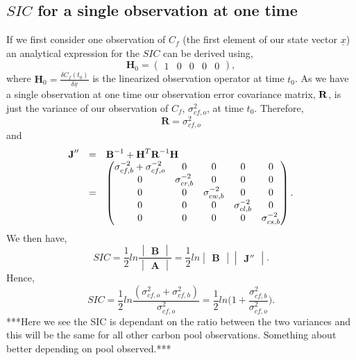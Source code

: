 \documentclass[11pt]{article}
\begin{document}
\subsection*{$SIC$ for a single observation at one time}

If we first consider one observation of $C_f$ (the first element of our state vector $\underline{x}$) an analytical expression for the $SIC$ can be derived using,
\[
\textbf{H}_{0} = \begin{pmatrix}
1 & 0 & 0 & 0 & 0
\end{pmatrix},
\] 
where $\textbf{H}_{0}=\frac{\delta C_f(t_0)}{\delta\underline{x}}$ is the linearized observation operator at time $t_0$. As we have a single observation at one time our observation error covariance matrix, $\bf{R}$, is just the variance of our observation of $C_f$, $\sigma_{cf,o}^{2}$, at time $t_0$. Therefore,
\[
\textbf{R}=\sigma_{cf,o}^{2}
\]  
and
\[
\begin{array} {lcl}
\textbf{J}'' &=& \textbf{B}^{-1}+\textbf{H}^{T}\textbf{R}^{-1}\bf{H} \\
&=& \begin{pmatrix} 
\sigma_{cf,b}^{-2}+\sigma_{cf,o}^{-2} & 0 & 0 & 0 & 0 \\
0 & \sigma_{cr,b}^{-2} & 0 & 0 & 0 \\
0 & 0 & \sigma_{cw,b}^{-2} & 0 & 0 \\
0 & 0 & 0 & \sigma_{cl,b}^{-2} & 0 \\
0 & 0 & 0 & 0 & \sigma_{cs,b}^{-2} \\
\end{pmatrix}.
\end{array}
\] 
We then have,
\[
SIC=\frac{1}{2}ln\frac{\begin{vmatrix} \textbf{B} \end{vmatrix}}{\begin{vmatrix} \textbf{A} \end{vmatrix}} = \frac{1}{2}ln\begin{vmatrix} \textbf{B} \end{vmatrix}\begin{vmatrix} \textbf{J}'' \end{vmatrix}.
\]
Hence,
\[
SIC = \frac{1}{2}ln\frac{(\sigma_{cf,o}^{2}+\sigma_{cf,b}^{2})}{\sigma_{cf,o}^{2}}
=\frac{1}{2}ln \bigg(1+\frac{\sigma_{cf,b}^{2}}{\sigma_{cf,o}^{2}}\bigg).
\]
***Here we see the SIC is dependant on the ratio between the two variances and this will be the same for all other carbon pool observations. Something about better depending on pool observed.*** 
\end{document}
